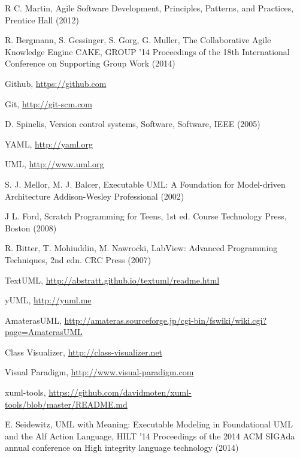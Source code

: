 \documentclass[runningheads,a4paper]{llncs}
\begin{document}
\begin{thebibliography}{12}



 R C. Martin,  Agile Software Development,  Principles,  Patterns,  and Practices,  Prentice Hall (2012)

 R. Bergmann,  S. Gessinger,  S. Gorg,  G. Muller,  The Collaborative Agile Knowledge Engine CAKE,  GROUP '14 Proceedings of the 18th International Conference on Supporting Group Work (2014)

 Github,  \url{https://github.com}

 Git, \url{http://git-scm.com}

 D. Spinelis, Version control systems, Software, Software, IEEE (2005)

 YAML,  \url{http://yaml.org}

 UML,  \url{http://www.uml.org}

 S. J. Mellor,  M. J. Balcer,  Executable UML: A Foundation for Model-driven Architecture Addison-Wesley Professional (2002)


  J L. Ford, Scratch Programming for Teens, 1st ed. Course Technology Press,
  Boston (2008)

 R. Bitter, T. Mohiuddin, M. Nawrocki, LabView: Advanced Programming Techniques,
  2nd edn. CRC Press (2007)

 TextUML,  \url{http://abstratt.github.io/textuml/readme.html}

 yUML,  \url{http://yuml.me}

 AmaterasUML,  \url{http://amateras.sourceforge.jp/cgi-bin/fswiki/wiki.cgi?page=AmaterasUML}

 Class Visualizer,  \url{http://class-visualizer.net}

 Visual Paradigm, \url{http://www.visual-paradigm.com}

 xuml-tools,  \url{https://github.com/davidmoten/xuml-tools/blob/master/README.md}

 E. Seidewitz,  UML with Meaning: Executable Modeling in Foundational
  UML and the Alf Action Language,  HILT '14 Proceedings of the 2014 ACM SIGAda annual conference on High integrity language technology (2014)


\end{thebibliography}
\end{document}
